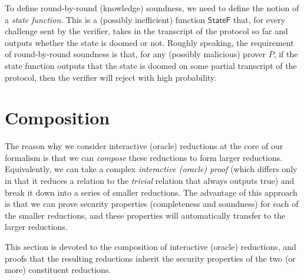 \begin{definition}
    \label{def:knowledge_soundness}
\end{definition}

To define round-by-round (knowledge) soundness, we need to define the notion of a \emph{state function}. This is a (possibly inefficient) function $\mathsf{StateF}$ that, for every challenge sent by the verifier, takes in the transcript of the protocol so far and outputs whether the state is doomed or not. Roughly speaking, the requirement of round-by-round soundness is that, for any (possibly malicious) prover $P$, if the state function outputs that the state is doomed on some partial transcript of the protocol, then the verifier will reject with high probability.

\begin{definition}
    \label{def:state_function}
\end{definition}

\begin{definition}
    \label{def:round_by_round_soundness}
\end{definition}

\begin{definition}
    \label{def:round_by_round_knowledge_soundness}
\end{definition}

\section{Composition}

The reason why we consider interactive (oracle) reductions at the core of our formalism is that we can \emph{compose} these reductions to form larger reductions. Equivalently, we can take a complex \emph{interactive (oracle) proof} (which differs only in that it reduces a relation to the \emph{trivial} relation that always outputs true) and break it down into a series of smaller reductions. The advantage of this approach is that we can prove security properties (completeness and soundness) for each of the smaller reductions, and these properties will automatically transfer to the larger reductions.

This section is devoted to the composition of interactive (oracle) reductions, and proofs that the resulting reductions inherit the security properties of the two (or more) constituent reductions.

